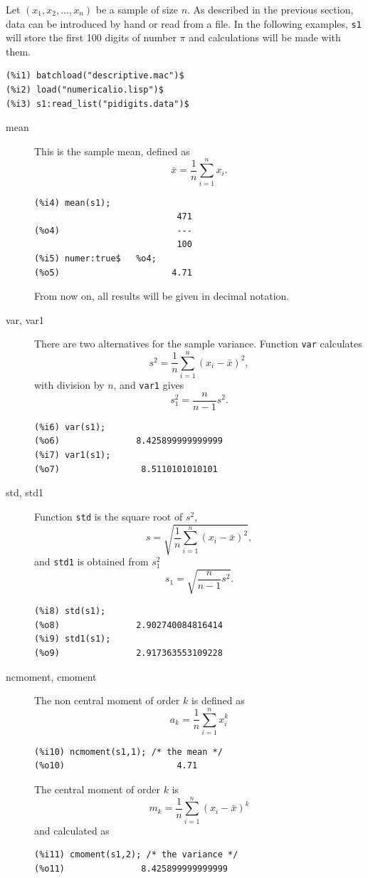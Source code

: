 \documentclass[12pt,a4paper]{article}
\begin{document}
Let $(x_1, x_2, \ldots, x_n)$ be a sample of size $n$. As described in the previous section,  data can be introduced by hand or read from a file. In the following examples, \verb|s1| will store the first 100 digits of number $\pi$ and calculations will be made with them.

\begin{verbatim}
(%i1) batchload("descriptive.mac")$
(%i2) load("numericalio.lisp")$
(%i3) s1:read_list("pidigits.data")$
\end{verbatim}


\begin{description}

\item[mean] This is the sample mean, defined as
\[
\bar{x}=\frac{1}{n} \sum_{i=1}^n x_i.
\]
\begin{verbatim}
(%i4) mean(s1);
                            471
(%o4)                       ---
                            100
(%i5) numer:true$   %o4;
(%o5)                      4.71
\end{verbatim}
From now on, all results will be given in decimal notation.

\item[var, var1] There are two alternatives for the sample variance. Function \verb|var| calculates
\[
s^2=\frac{1}{n} \sum_{i=1}^n (x_i-\bar{x})^2,
\]
with division by $n$, and \verb|var1| gives
\[
s_1^2=\frac{n}{n-1}s^2.
\]
\begin{verbatim}
(%i6) var(s1);
(%o6)               8.425899999999999
(%i7) var1(s1);
(%o7)                8.5110101010101
\end{verbatim}

\item[std, std1] Function \verb|std| is the square root of $s^2$,
\[
s=\sqrt{\frac{1}{n} \sum_{i=1}^n (x_i-\bar{x})^2},
\]
and \verb|std1| is obtained from $s_1^2$
\[
s_1=\sqrt{\frac{n}{n-1}s^2}.
\]
\begin{verbatim}
(%i8) std(s1);
(%o8)               2.902740084816414
(%i9) std1(s1);
(%o9)               2.917363553109228
\end{verbatim}

\item[ncmoment, cmoment] The non central moment of order $k$ is defined as
\[
a_k=\frac{1}{n} \sum_{i=1}^n x_i^k
\]
\begin{verbatim}
(%i10) ncmoment(s1,1); /* the mean */
(%o10)                      4.71
\end{verbatim}

The central moment of order $k$ is
\[
m_k=\frac{1}{n} \sum_{i=1}^n (x_i - \bar{x})^k
\]
and calculated as
\begin{verbatim}
(%i11) cmoment(s1,2); /* the variance */
(%o11)               8.425899999999999
\end{verbatim}


\end{description}
\end{document}
